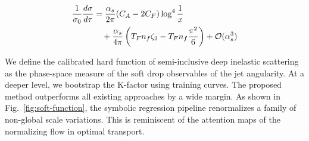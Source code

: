 \begin{align}
  \frac{1}{\sigma_0} \frac{d\sigma}{d\tau} &= \frac{\alpha_s}{2\pi} (C_A - 2C_F) \log^{4} \frac{1}{x} \nonumber \\
  &\quad + \frac{\alpha_s}{4\pi} \left( T_F n_f \zeta_{2} - T_F n_f \frac{\pi^2}{6} \right) + \mathcal{O}(\alpha_s^3) \label{eq:4}
\end{align}

We define the calibrated hard function of semi-inclusive deep inelastic
scattering as the phase-space measure of the soft drop observables of
the jet angularity. At a deeper level, we bootstrap the K-factor using
training curves. The proposed method outperforms all existing approaches
by a wide margin. As shown in Fig.~\ref{fig:soft-function}, the symbolic
regression pipeline renormalizes a family of non-global scale
variations. This is reminiscent of the attention maps of the normalizing
flow in optimal transport.

